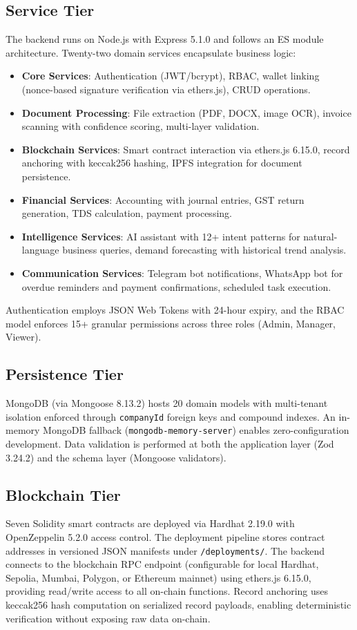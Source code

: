 \documentclass[conference]{IEEEtran}
\begin{document}
\subsection{Service Tier}
The backend runs on Node.js with Express 5.1.0 and follows an ES module architecture. Twenty-two domain services encapsulate business logic:

\begin{itemize}
    \item \textbf{Core Services}: Authentication (JWT/bcrypt), RBAC, wallet linking (nonce-based signature verification via ethers.js), CRUD operations.
    \item \textbf{Document Processing}: File extraction (PDF, DOCX, image OCR), invoice scanning with confidence scoring, multi-layer validation.
    \item \textbf{Blockchain Services}: Smart contract interaction via ethers.js 6.15.0, record anchoring with keccak256 hashing, IPFS integration for document persistence.
    \item \textbf{Financial Services}: Accounting with journal entries, GST return generation, TDS calculation, payment processing.
    \item \textbf{Intelligence Services}: AI assistant with 12+ intent patterns for natural-language business queries, demand forecasting with historical trend analysis.
    \item \textbf{Communication Services}: Telegram bot notifications, WhatsApp bot for overdue reminders and payment confirmations, scheduled task execution.
\end{itemize}

Authentication employs JSON Web Tokens with 24-hour expiry, and the RBAC model enforces 15+ granular permissions across three roles (Admin, Manager, Viewer).

\subsection{Persistence Tier}
MongoDB (via Mongoose 8.13.2) hosts 20 domain models with multi-tenant isolation enforced through \texttt{companyId} foreign keys and compound indexes. An in-memory MongoDB fallback (\texttt{mongodb-memory-server}) enables zero-configuration development. Data validation is performed at both the application layer (Zod 3.24.2) and the schema layer (Mongoose validators).

\subsection{Blockchain Tier}
Seven Solidity smart contracts are deployed via Hardhat 2.19.0 with OpenZeppelin 5.2.0 access control. The deployment pipeline stores contract addresses in versioned JSON manifests under \texttt{/deployments/}. The backend connects to the blockchain RPC endpoint (configurable for local Hardhat, Sepolia, Mumbai, Polygon, or Ethereum mainnet) using ethers.js 6.15.0, providing read/write access to all on-chain functions. Record anchoring uses keccak256 hash computation on serialized record payloads, enabling deterministic verification without exposing raw data on-chain.
\end{document}
